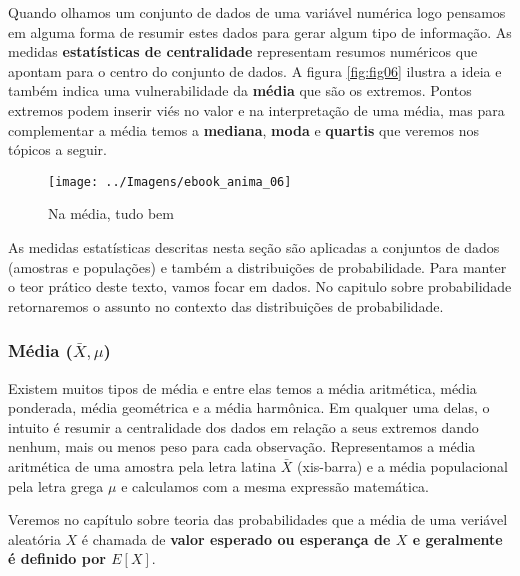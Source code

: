 \documentclass[11pt,]{style/krantz}
\renewenvironment{quote}{\begin{VF}}{\end{VF}}
\theoremstyle{definition}
\theoremstyle{definition}
\theoremstyle{definition}
\theoremstyle{remark}
\begin{document}
Quando olhamos um conjunto de dados de uma variável numérica logo pensamos em alguma forma de resumir estes dados para gerar algum tipo de informação. As medidas \textbf{estatísticas de centralidade} representam resumos numéricos que apontam para o centro do conjunto de dados. A figura \ref{fig:fig06} ilustra a ideia e também indica uma vulnerabilidade da \textbf{média} que são os extremos. Pontos extremos podem inserir viés no valor e na interpretação de uma média, mas para complementar a média temos a \textbf{mediana}, \textbf{moda} e \textbf{quartis} que veremos nos tópicos a seguir.

\begin{figure}[H]

{\centering \texttt{[image: ../Imagens/ebook\_anima\_06]} 

}

\caption{Na média, tudo bem}\label{fig:fig07}
\end{figure}

\begin{quote}
As medidas estatísticas descritas nesta seção são aplicadas a conjuntos de dados (amostras e populações) e também a distribuições de probabilidade. Para manter o teor prático deste texto, vamos focar em dados. No capitulo sobre probabilidade retornaremos o assunto no contexto das distribuições de probabilidade.
\end{quote}

\hypertarget{media-bar-x-mu}{%
\subsubsection{\texorpdfstring{Média (\(\bar X, \mu\))}{Média (\textbackslash{}bar X, \textbackslash{}mu)}}\label{media-bar-x-mu}}

Existem muitos tipos de média e entre elas temos a média aritmética, média ponderada, média geométrica e a média harmônica. Em qualquer uma delas, o intuito é resumir a centralidade dos dados em relação a seus extremos dando nenhum, mais ou menos peso para cada observação. Representamos a média aritmética de uma amostra pela letra latina \(\bar X\) (xis-barra) e a média populacional pela letra grega \(\mu\) e calculamos com a mesma expressão matemática.

\begin{quote}
Veremos no capítulo sobre teoria das probabilidades que a média de uma veriável aleatória \(X\) é chamada de \textbf{valor esperado ou esperança de \(X\) e geralmente é definido por \(E[X]\)}.
\end{quote}
\end{document}
